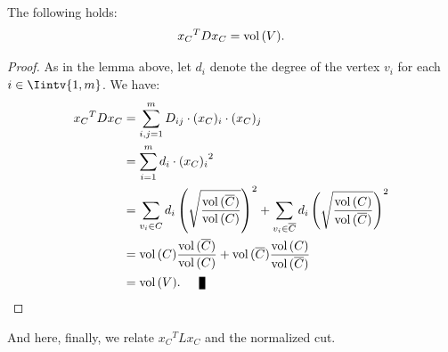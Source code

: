 \begin{lemma} \label{cond2}
   The following holds:
   \begin{equation}
      {x_C}^TDx_C = \operatorname*{vol\,} (V).
   \end{equation}
\end{lemma}
\begin{proof}
   As in the lemma above, let $d_i$ denote the degree of the vertex $v_i$ for each $i \in \Iintv{1,m}$. We have:
   \begin{equation*}
      \begin{split}
         {x_C}^T D x_C &= \sum_{i,j=1}^m D_{ij} \cdot (x_C)_i \cdot (x_C)_j \\
         &= \sum_{i=1}^m d_i \cdot {(x_C)_i}^2 \\
         &= \sum_{v_i \in C} d_i \left( \sqrt{\frac{\vol (\overline C)}{\vol (C)}} \right)^2
         + \sum_{v_i \in \overline C} d_i \left( \sqrt{\frac{\vol (C)}{\vol (\overline C)}} \right)^2 \\
         &= \vol(C) \frac{\vol (\overline C)}{\vol(C)} + \vol(\overline C) \frac{\vol (C)}{\vol ( \overline C)} \\
         &= \vol (V). \qed
      \end{split}
   \end{equation*}
\end{proof}

And here, finally, we relate ${x_C}^TL{x_C}$ and the normalized cut.


